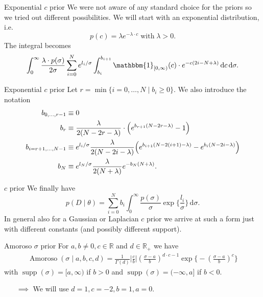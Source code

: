 \documentclass{beamer}
\newcommand{\R}{\mathbb{R}}
\newcommand{\dx}{\, \mathrm{d}}
\begin{document}
	\begin{frame}[noframenumbering]{Exponential $c$ prior}
		We were not aware of any standard choice for the priors so we tried out 
		different possibilities. We will start with an exponential distribution, 
		i.e.
		\[		
			p(c) = \lambda e^{-\lambda\cdot c} \; \text{with} \; \lambda > 0.
		\]
		The integral becomes
		\[
			\int_0^\infty \frac{\lambda \cdot p(\sigma)}{2\sigma}  \sum_{i = 0}^N 
			e^{l_i/\sigma} \int_{b_i}^{b_{i + 1}} \mathbbm{1}_{[0, \infty)}(c) 
			\cdot e^{-c(2i -N + \lambda)} \dx c \dx \sigma.
		\]
	\end{frame}
	
	\begin{frame}{Exponential $c$ prior}
	Let $r = \min\{i = 0, \ldots, N \mid b_i \geq 0\}$. We also introduce the 
	notation	
		\begin{align*}
			b_{0, \ldots, r-1} &\equiv 0 \\
    		b_r &\equiv \frac{\lambda}{2(N -2r - \lambda)} \cdot \Bigl( 
    		e^{b_{r + 1} (N -2r - \lambda)} - 1 \Bigr) \\
    		b_{i = r + 1, \ldots, N - 1} &\equiv e^{l_i/\sigma} \frac{\lambda}{2(N 
    		- 2i - \lambda)}\Bigl(e^{b_{i + 1} (N -2(i+1) - \lambda)} - e^{b_i 
    		(N -2i - \lambda)} \Bigr) \\
    		b_N &\equiv e^{l_N/\sigma} \frac{\lambda}{2(N + \lambda)} e^{-b_N 
    		(N + \lambda)}.
		\end{align*}
	\end{frame}
	
	\begin{frame}{$c$ prior}
		We finally have
		\[
			p(D \mid \theta) = \sum_{i = 0}^N b_i \int_0^\infty \frac{p(\sigma)}
			{\sigma} \exp \biggl\{\frac{l_i}{\sigma} \biggr\} \dx \sigma.
		\]
		In general also for a Gaussian or Laplacian $c$ prior we arrive at such a form 
		just with different constants (and possibly different support).
	\end{frame}
	
	\begin{frame}{Amoroso $\sigma$ prior}
		For $a, b \neq 0, c \in \R$ and $d \in \R_+$ we have
		\begin{align*}
    		\operatorname{Amoroso}(\sigma \mid a, b, c, d) = \frac{1}{\Gamma(d)} 				\bigg \lvert \frac{c}{b} \bigg \lvert \left( \frac{\sigma - a}{b} 					\right)^{d\cdot c - 1} \exp \biggl\{- \left(\frac{\sigma - a}{b} 					\right)^c \biggr\}
		\end{align*}
		with $\operatorname{supp}(\sigma) = [a, \infty)$ if $b > 0$ and $					\operatorname{supp}(\sigma) = (-\infty, a]$ if $b < 0$.
		\begin{itemize}
			\item[$\implies$]We will use $d = 1, c = -2, b = 1, a = 0$.
		\end{itemize}
	\end{frame}
	
\end{document}
